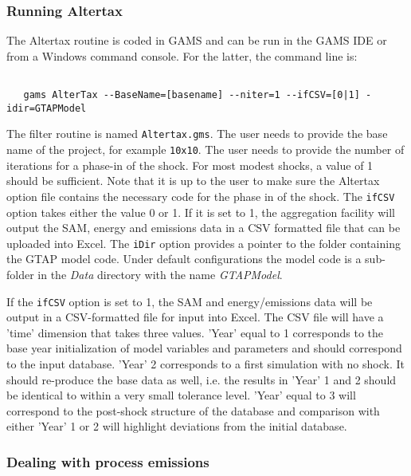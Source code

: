 \subsubsection{Running Altertax}

The Altertax routine is coded in GAMS and can be run in the GAMS IDE or from a
Windows command console. For the latter, the command line is:

\begin{verbatim}

   gams AlterTax --BaseName=[basename] --niter=1 --ifCSV=[0|1] -idir=GTAPModel

\end{verbatim}

The filter routine is named \texttt{Altertax.gms}. The user needs to provide the
base name of the project, for example \texttt{10x10}. The user needs to provide
the number of iterations for a phase-in of the shock. For most modest shocks, a
value of 1 should be sufficient. Note that it is up to the user to make sure the
Altertax option file contains the necessary code for the phase in of the shock.
The \texttt{ifCSV} option takes either the value 0 or 1. If it is set to 1, the
aggregation facility will output the SAM, energy and emissions data in a CSV
formatted file that can be uploaded into Excel. The \texttt{iDir} option
provides a pointer to the folder containing the GTAP model code. Under default
configurations the model code is a sub-folder in the \emph{Data} directory with
the name \emph{GTAPModel}.

If the \texttt{ifCSV} option is set to 1, the SAM and energy/emissions data will
be output in a CSV-formatted file for input into Excel. The CSV file will have a
'time' dimension that takes three values. 'Year' equal to 1 corresponds to the
base year initialization of model variables and parameters and should correspond
to the input database. 'Year' 2 corresponds to a first simulation with no shock.
It should re-produce the base data as well, i.e. the results in 'Year' 1 and 2
should be identical to within a very small tolerance level. 'Year' equal to 3
will correspond to the post-shock structure of the database and comparison with
either 'Year' 1 or 2 will highlight deviations from the initial database.

\subsubsection{Dealing with process emissions}
\label{sec:pcarb0}

